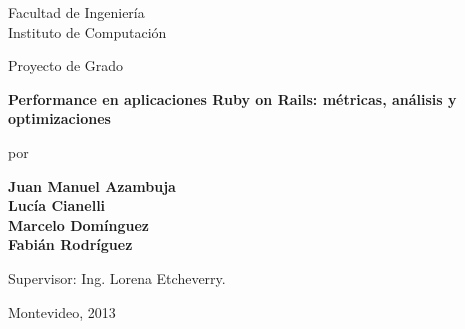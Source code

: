 \pagestyle{empty}
\sffamily

\noindent
\begin{center}
    \Large
    Facultad de Ingenier\'ia\\
    Instituto de Computaci\'on
\end{center}

\vfill\vfill
\begin{center}
    \large
    Proyecto de Grado\\
\end{center}

\vfill
\begin{center}
    \Huge\bfseries
    Performance en aplicaciones Ruby on Rails: m\'etricas, an\'alisis y optimizaciones
\end{center}

\vfill
\begin{center}
    \Large
    por
\end{center}

\vfill
\begin{center}
    \huge\bfseries
    Juan Manuel Azambuja\\
	Luc\'ia Cianelli\\
	Marcelo Dom\'inguez\\
	Fabi\'an Rodr\'iguez\\
\end{center}

\vfill\vfill\vfill
\begin{center}
    \Large
    Supervisor: Ing. Lorena Etcheverry.
\end{center}

\vfill
\begin{center}
\large
    Montevideo, 2013
\end{center}

\cleardoublepage

\rmfamily
\normalfont

\newpage
\pagestyle{empty}
\mbox{}
